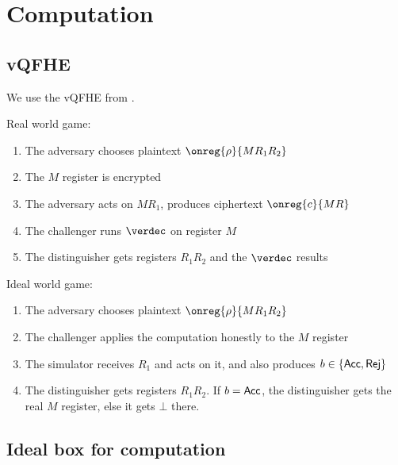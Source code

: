 \section{Computation}


\subsection{vQFHE}

We use the vQFHE from \cite{magic_circuits}.



Real world game:
\begin{enumerate}
	\item The adversary chooses plaintext $\onreg{\rho}{MR_1R_2}$
	\item The $M$ register is encrypted
	\item The adversary acts on $MR_1$, produces ciphertext $\onreg{c}{MR}$
	\item The challenger runs $\verdec$ on register $M$
	\item The distinguisher gets registers $R_1R_2$ and the $\verdec$ results
\end{enumerate}

Ideal world game:
\begin{enumerate}
	\item The adversary chooses plaintext $\onreg{\rho}{MR_1R_2}$
	\item The challenger applies the computation honestly to the $M$ register
	\item The simulator receives $R_1$ and acts on it, and also produces $b\in\left\{{\mathsf{Acc}}, {\mathsf{Rej}}\right\}$
	\item The distinguisher gets registers $R_1R_2$. If $b={\mathsf{Acc}}$, the distinguisher gets the real $M$ register, else it gets $\bot$ there.
\end{enumerate}

\subsection{Ideal box for computation}

